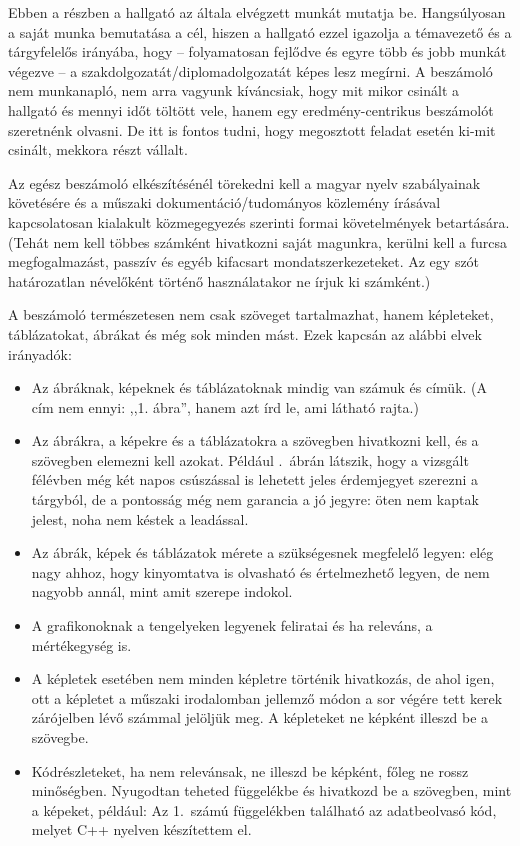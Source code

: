 \documentclass[a4paper,oneside]{article}
\begin{document}
Ebben a részben a hallgató az általa elvégzett munkát mutatja
be. Hangsúlyosan a saját munka bemutatása a cél, hiszen a hallgató
ezzel igazolja a témavezető és a tárgyfelelős irányába, hogy --
folyamatosan fejlődve és egyre több és jobb munkát végezve -- a
szakdolgozatát/diplomadolgozatát képes lesz megírni.  A beszámoló nem
munkanapló, nem arra vagyunk kíváncsiak, hogy mit mikor csinált a
hallgató és mennyi időt töltött vele, hanem egy eredmény-centrikus
beszámolót szeretnénk olvasni.  De itt is fontos tudni, hogy
megosztott feladat esetén ki-mit csinált, mekkora részt vállalt.

Az egész beszámoló elkészítésénél törekedni kell a magyar nyelv
szabályainak követésére és a műszaki dokumentáció/tudományos közlemény
írásával kapcsolatosan kialakult közmegegyezés szerinti formai
követelmények betartására.  (Tehát nem kell többes számként hivatkozni
saját magunkra, kerülni kell a furcsa megfogalmazást, passzív és egyéb
kifacsart mondatszerkezeteket.  Az egy szót határozatlan névelőként
történő használatakor ne írjuk ki számként.)


A beszámoló természetesen nem csak szöveget tartalmazhat, hanem
képleteket, táblázatokat, ábrákat és még sok minden mást.  Ezek
kapcsán az alábbi elvek irányadók:
\begin{itemize}
\item Az ábráknak, képeknek és táblázatoknak mindig van számuk és
  címük. (A cím nem ennyi: ,,1. ábra'', hanem azt írd le, ami látható
  rajta.)

\item Az ábrákra, a képekre és a táblázatokra a szövegben hivatkozni
  kell, és a szövegben elemezni kell azokat. Például
  .~ábrán látszik, hogy a vizsgált félévben még két
  napos csúszással is lehetett jeles érdemjegyet szerezni a tárgyból,
  de a pontosság még nem garancia a jó jegyre: öten nem kaptak jelest,
  noha nem késtek a leadással.

\item Az ábrák, képek és táblázatok mérete a szükségesnek megfelelő
  legyen: elég nagy ahhoz, hogy kinyomtatva is olvasható és
  értelmezhető legyen, de nem nagyobb annál, mint amit szerepe
  indokol.

\item A grafikonoknak a tengelyeken legyenek feliratai és ha releváns,
  a mértékegység is.

\item A képletek esetében nem minden képletre történik hivatkozás, de
  ahol igen, ott a képletet a műszaki irodalomban jellemző módon a sor
  végére tett kerek zárójelben lévő számmal jelöljük meg.  A
  képleteket ne képként illeszd be a szövegbe.

\item Kódrészleteket, ha nem relevánsak, ne illeszd be képként, főleg
  ne rossz minőségben. Nyugodtan teheted függelékbe és hivatkozd be a
  szövegben, mint a képeket, például: Az 1.~számú függelékben
  található az adatbeolvasó kód, melyet C++ nyelven készítettem el.
\end{itemize}
\end{document}
